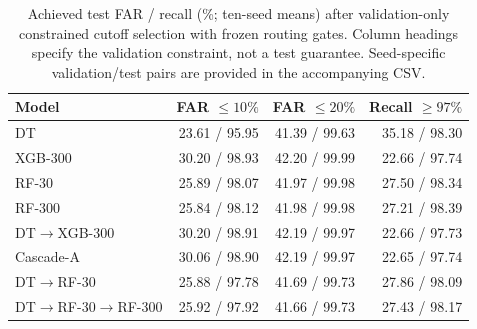 \begin{table}[!htbp]
\centering
\caption{Achieved test FAR / recall (\%; ten-seed means) after validation-only constrained cutoff selection with frozen routing gates. Column headings specify the validation constraint, not a test guarantee. Seed-specific validation/test pairs are provided in the accompanying CSV.}
\label{tab:transfer}
\small
\setlength{\tabcolsep}{4pt}
\begin{tabularx}{\textwidth}{@{}Xrrr@{}}
\toprule
Model & FAR $\le10\%$ & FAR $\le20\%$ & Recall $\ge97\%$ \\
\midrule
DT & 23.61 / 95.95 & 41.39 / 99.63 & 35.18 / 98.30 \\
XGB-300 & 30.20 / 98.93 & 42.20 / 99.99 & 22.66 / 97.74 \\
RF-30 & 25.89 / 98.07 & 41.97 / 99.98 & 27.50 / 98.34 \\
RF-300 & 25.84 / 98.12 & 41.98 / 99.98 & 27.21 / 98.39 \\
DT$\to$XGB-300 & 30.20 / 98.91 & 42.19 / 99.97 & 22.66 / 97.73 \\
Cascade-A & 30.06 / 98.90 & 42.19 / 99.97 & 22.65 / 97.74 \\
DT$\to$RF-30 & 25.88 / 97.78 & 41.69 / 99.73 & 27.86 / 98.09 \\
DT$\to$RF-30$\to$RF-300 & 25.92 / 97.92 & 41.66 / 99.73 & 27.43 / 98.17 \\
\bottomrule
\end{tabularx}
\end{table}
